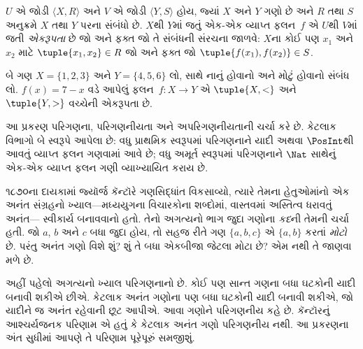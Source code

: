 \begin{defn}[એકરૂપતા]
$U$ એ જોડી $\langle X, R\rangle$ અને $V$ એ જોડી
$\langle Y, S\rangle$ હોય, જ્યાં $X$ અને $Y$ ગણો છે અને
$R$ તથા $S$ અનુક્રમે $X$ તથા $Y$ પરના સંબંધો છે.
$X$થી $Y$માં જતું એક-એક વ્યાપ્ત ફલન~$f$ એ $U$થી $V$માં જતી
\emph{એકરૂપતા} છે જો અને ફક્ત જો તે સંબંધની સંરચના જાળવે:
$X$ના કોઈ પણ $x_{1}$ અને $x_{2}$ માટે
$\tuple{x_1,x_2} \in R$ જો અને ફક્ત જો
$\tuple{f(x_1),f(x_2)} \in S$.
\end{defn}

\begin{ex}
બે ગણ $X=\{1,2,3\}$ અને $Y=\{4,5,6\}$ લો,
સાથે નાનું હોવાનો અને મોટું હોવાનો સંબંધ લો.
$f(x) = 7-x$ વડે આપેલું ફલન~$f\colon X \to Y$
એ $\tuple{X,<}$ અને $\tuple{Y,>}$ વચ્ચેની એકરૂપતા છે.
\end{ex}
\endgroup
\endgroup


\begingroup
\makeatletter{}\makeatother

\label{guunit:OLP-0027}


\begin{editorial}
આ પ્રકરણ પરિગણના, પરિગણનીયતા અને અપરિગણનીયતાની ચર્ચા કરે છે.
કેટલાક વિભાગો બે સ્વરૂપે આપેલા છે: વધુ પ્રાથમિક સ્વરૂપમાં
પરિગણનાને યાદી અથવા $\PosInt$થી આવતું વ્યાપ્ત ફલન
ગણવામાં આવે છે; વધુ અમૂર્ત સ્વરૂપમાં પરિગણનાને
$\Nat$ સાથેનું એક-એક વ્યાપ્ત ફલન ગણી વ્યાખ્યાયિત કરાય છે.
\end{editorial}

\begingroup
\makeatletter{}\makeatother


\label{guunit:OLP-0028}


૧૮૭૦ના દાયકામાં જ્યૉર્જ કૅન્ટૉરે ગણસિદ્ધાંત વિકસાવ્યો,
ત્યારે તેમના હેતુઓમાંનો એક અનંત સંગ્રહનો ખ્યાલ---મધ્યયુગના
વિચારકોના શબ્દોમાં, વાસ્તવમાં અસ્તિત્વ ધરાવતું અનંત---
સ્વીકાર્ય બનાવવાનો હતો. તેનો અગત્યનો ભાગ જુદા ગણોના
\emph{કદ}ની તેમની ચર્ચા હતી. જો $a$, $b$ અને $c$
બધા જુદા હોય, તો સહજ રીતે ગણ $\{a, b, c\}$ એ
$\{a, b\}$ કરતાં \emph{મોટો} છે. પરંતુ અનંત ગણો વિશે
શું? શું તે બધા એકબીજા જેટલા મોટા છે? એમ નથી તે જાણવા મળે છે.

અહીં પહેલો અગત્યનો ખ્યાલ પરિગણનાનો છે. કોઈ પણ સાન્ત
ગણના બધા ઘટકોની યાદી બનાવી શકીએ છીએ.
કેટલાક અનંત ગણોના પણ બધા ઘટકોની યાદી બનાવી
શકીએ, જો યાદીને જ અનંત રહેવાની છૂટ આપીએ.
આવા ગણોને પરિગણનીય કહે છે. કૅન્ટૉરનું આશ્ચર્યજનક
પરિણામ એ હતું કે કેટલાક અનંત ગણો પરિગણનીય નથી.
આ પ્રકરણના અંત સુધીમાં આપણે તે પરિણામ પૂરેપૂરું સમજીશું.
\endgroup



